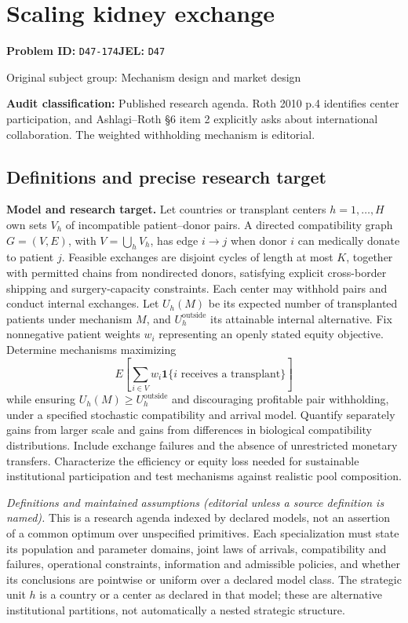 \documentclass[11pt,a4paper]{article}
\begin{document}
\section*{Scaling kidney exchange}
\textbf{Problem ID:} \texttt{D47-174}\quad \textbf{JEL:} \texttt{D47}\par
\label{problem:OP-0298}
{\sffamily\small\color{muted}Original subject group: Mechanism design and market design\par}
\label{definitions:problem:30007580}
\textbf{Audit classification:} Published research agenda. Roth 2010 p.4 identifies center participation, and Ashlagi–Roth §6 item 2 explicitly asks about international collaboration. The weighted withholding mechanism is editorial.
\subsection*{Definitions and precise research target}
\textbf{Model and research target.} Let countries or transplant centers \(h=1,\ldots,H\) own sets \(V_h\) of incompatible patient–donor pairs. A directed compatibility graph \(G=(V,E)\), with \(V=\bigcup_hV_h\), has edge \(i\to j\) when donor \(i\) can medically donate to patient \(j\). Feasible exchanges are disjoint cycles of length at most \(K\), together with permitted chains from nondirected donors, satisfying explicit cross-border shipping and surgery-capacity constraints. Each center may withhold pairs and conduct internal exchanges. Let \(U_h(M)\) be its expected number of transplanted patients under mechanism \(M\), and \(U_h^{\mathrm{outside}}\) its attainable internal alternative. Fix nonnegative patient weights \(w_i\) representing an openly stated equity objective. Determine mechanisms maximizing
\[
 E\left[\sum_{i\in V}w_i\mathbf1\{i\text{ receives a transplant}\}\right]
\]
while ensuring \(U_h(M)\geq U_h^{\mathrm{outside}}\) and discouraging profitable pair withholding, under a specified stochastic compatibility and arrival model. Quantify separately gains from larger scale and gains from differences in biological compatibility distributions. Include exchange failures and the absence of unrestricted monetary transfers. Characterize the efficiency or equity loss needed for sustainable institutional participation and test mechanisms against realistic pool composition.

\emph{Definitions and maintained assumptions (editorial unless a source definition is named).} This is a research agenda indexed by declared models, not an assertion of a common optimum over unspecified primitives. Each specialization must state its population and parameter domains, joint laws of arrivals, compatibility and failures, operational constraints, information and admissible policies, and whether its conclusions are pointwise or uniform over a declared model class. The strategic unit \(h\) is a country or a center as declared in that model; these are alternative institutional partitions, not automatically a nested strategic structure.
\end{document}
